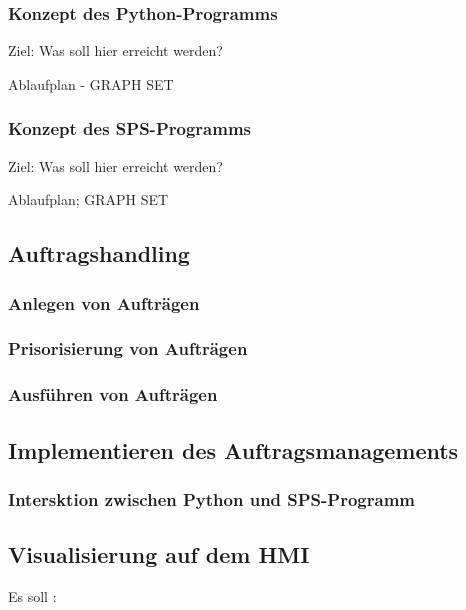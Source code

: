 \subsubsection{Konzept des Python-Programms}
Ziel: Was soll hier erreicht werden?

Ablaufplan - GRAPH SET

\subsubsection{Konzept des SPS-Programms}
Ziel: Was soll hier erreicht werden?

Ablaufplan; GRAPH SET



\subsection{Auftragshandling}
\subsubsection{Anlegen von Aufträgen}
\subsubsection{Prisorisierung von Aufträgen}
\subsubsection{Ausführen von Aufträgen}


\subsection{Implementieren des Auftragsmanagements}


\subsubsection{Intersktion zwischen Python und SPS-Programm}


\subsection{Visualisierung auf dem HMI}

Es soll :



